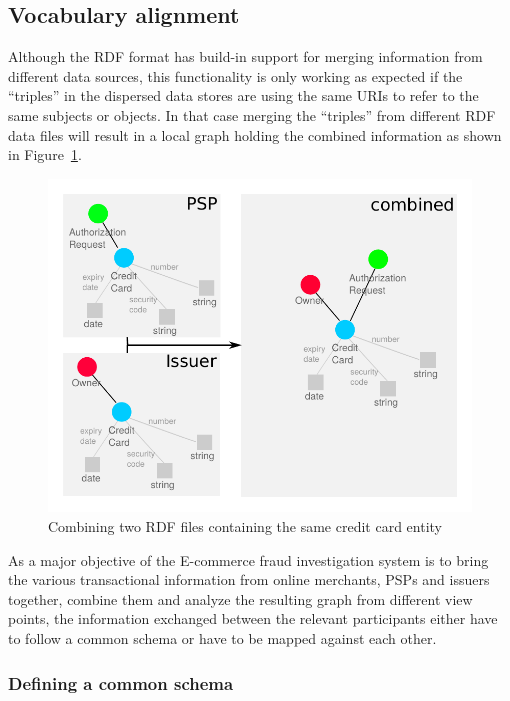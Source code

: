 \subsection{Vocabulary alignment}
\label{subsec:vocab_align}

Although the \gls{RDF} format has build-in support for merging information from different data sources, this functionality is only working as expected if the ``triples'' in the dispersed data stores are using the same \gls{URI}s to refer to the same subjects or objects. In that case merging the ``triples'' from different \gls{RDF} data files will result in a local graph holding the combined information as shown in Figure~\ref{fig:images_combine_rdf_graph}. \\

\begin{figure}[!ht]
	\centering
		\includegraphics[width=0.9\columnwidth]{images/combine_rdf_graph.pdf}
	\caption{Combining two \gls{RDF} files containing the same credit card entity}
\label{fig:images_combine_rdf_graph}
\end{figure}

As a major objective of the \gls{E-commerce} fraud investigation system is to bring the various transactional information from online merchants, \gls{PSP}s and issuers together, combine them and analyze the resulting graph from different view points, the information exchanged between the relevant participants either have to follow a common schema or have to be mapped against each other.

\subsubsection{Defining a common schema}
\label{subsub:rdf_schema_design}

